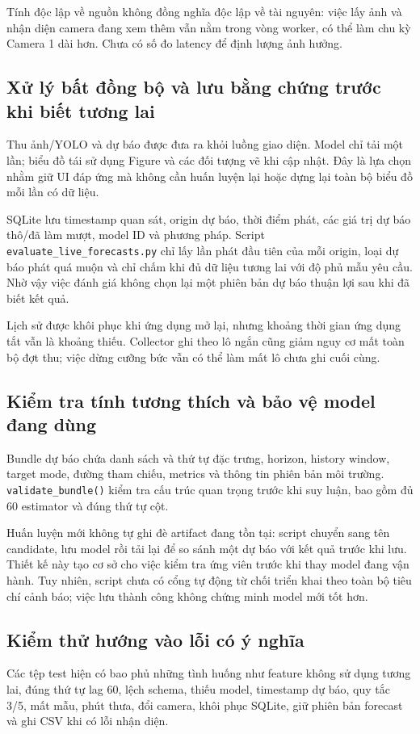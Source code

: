     Tính độc lập về nguồn không đồng nghĩa độc lập về tài nguyên: việc lấy ảnh và nhận diện camera đang xem thêm vẫn nằm trong vòng worker, có thể làm chu kỳ Camera 1 dài hơn. Chưa có số đo latency để định lượng ảnh hưởng.

    \subsection{Xử lý bất đồng bộ và lưu bằng chứng trước khi biết tương lai}
    Thu ảnh/YOLO và dự báo được đưa ra khỏi luồng giao diện. Model chỉ tải một lần; biểu đồ tái sử dụng Figure và các đối tượng vẽ khi cập nhật. Đây là lựa chọn nhằm giữ UI đáp ứng mà không cần huấn luyện lại hoặc dựng lại toàn bộ biểu đồ mỗi lần có dữ liệu.

    SQLite lưu timestamp quan sát, origin dự báo, thời điểm phát, các giá trị dự báo thô/đã làm mượt, model ID và phương pháp. Script \texttt{evaluate\_live\_forecasts.py} chỉ lấy lần phát đầu tiên của mỗi origin, loại dự báo phát quá muộn và chỉ chấm khi đủ dữ liệu tương lai với độ phủ mẫu yêu cầu. Nhờ vậy việc đánh giá không chọn lại một phiên bản dự báo thuận lợi sau khi đã biết kết quả.

    Lịch sử được khôi phục khi ứng dụng mở lại, nhưng khoảng thời gian ứng dụng tắt vẫn là khoảng thiếu. Collector ghi theo lô ngắn cũng giảm nguy cơ mất toàn bộ đợt thu; việc dừng cưỡng bức vẫn có thể làm mất lô chưa ghi cuối cùng.

    \subsection{Kiểm tra tính tương thích và bảo vệ model đang dùng}
    Bundle dự báo chứa danh sách và thứ tự đặc trưng, horizon, history window, target mode, đường tham chiếu, metrics và thông tin phiên bản môi trường. \texttt{validate\_bundle()} kiểm tra cấu trúc quan trọng trước khi suy luận, bao gồm đủ 60 estimator và đúng thứ tự cột.

    Huấn luyện mới không tự ghi đè artifact đang tồn tại: script chuyển sang tên candidate, lưu model rồi tải lại để so sánh một dự báo với kết quả trước khi lưu. Thiết kế này tạo cơ sở cho việc kiểm tra ứng viên trước khi thay model đang vận hành. Tuy nhiên, script chưa có cổng tự động từ chối triển khai theo toàn bộ tiêu chí cảnh báo; việc lưu thành công không chứng minh model mới tốt hơn.

    \subsection{Kiểm thử hướng vào lỗi có ý nghĩa}
    Các tệp test hiện có bao phủ những tình huống như feature không sử dụng tương lai, đúng thứ tự lag 60, lệch schema, thiếu model, timestamp dự báo, quy tắc 3/5, mất mẫu, phút thưa, đổi camera, khôi phục SQLite, giữ phiên bản forecast và ghi CSV khi có lỗi nhận diện.

